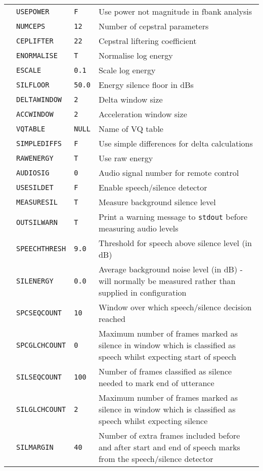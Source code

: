 \begin{center}
\begin{supertabular}{|p{1.4cm}|l|l|p{6.6cm}|}
  & \texttt{USEPOWER}  & \texttt{F} & Use power not magnitude in fbank analysis \\ 
  & \texttt{NUMCEPS}   & \texttt{12} & Number of cepstral parameters \\  
  & \texttt{CEPLIFTER} &   \texttt{22} & Cepstral liftering coefficient \\ 
  & \texttt{ENORMALISE} & \texttt{T} & Normalise log energy \\  
  & \texttt{ESCALE} & \texttt{0.1} & Scale log energy \\   
  & \texttt{SILFLOOR} & \texttt{50.0} & Energy silence floor in dBs \\   
  & \texttt{DELTAWINDOW} & \texttt{2} & Delta window size \\  
  & \texttt{ACCWINDOW} & \texttt{2} & Acceleration window size \\  
  & \texttt{VQTABLE} & \texttt{NULL} & Name of VQ table \\  
  & \texttt{SIMPLEDIFFS} & \texttt{F} & Use simple differences for delta calculations \\ 
  & \texttt{RAWENERGY}  & \texttt{T} & Use raw energy \\ 
  & \texttt{AUDIOSIG} & \texttt{0} & Audio signal number for remote control \\ 
  & \texttt{USESILDET}  & \texttt{F} & Enable speech/silence detector \\ 
  & \texttt{MEASURESIL} & \texttt{T} & Measure background silence level \\ 
  & \texttt{OUTSILWARN} & \texttt{T} & Print a warning message to {\tt stdout} before 
measuring audio levels \\ 
  & \texttt{SPEECHTHRESH} & \texttt{9.0} & Threshold for speech above silence level (in dB) \\ 
  & \texttt{SILENERGY}    & \texttt{0.0} & Average background noise level (in dB) - will 
normally be measured rather than supplied in configuration \\ 
  & \texttt{SPCSEQCOUNT}  & \texttt{10} & Window over which speech/silence decision reached \\ 
  & \texttt{SPCGLCHCOUNT} & \texttt{0} & Maximum number of frames marked as silence in window which is
  classified as speech whilst expecting start of speech \\   
  & \texttt{SILSEQCOUNT}  & \texttt{100} & Number of frames classified as silence needed to mark end of
  utterance \\ 
  & \texttt{SILGLCHCOUNT} & \texttt{2} & Maximum number of frames marked as silence in window which is
  classified as speech whilst expecting silence \\   
  & \texttt{SILMARGIN} & \texttt{40} & Number of extra frames included before and after start and end of
  speech marks from the speech/silence detector \\ \hline


\end{supertabular}
\end{center}
